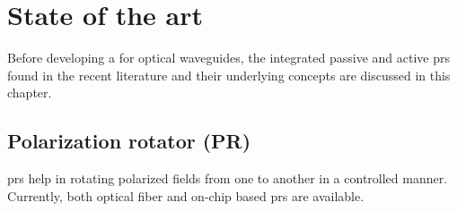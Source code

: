 \documentclass[../report.tex]{subfiles}
\begin{document}
	
	
\chapter{State of the art}
Before developing a  for optical waveguides, the integrated passive and active \gls{pr}s found in the recent literature and their underlying concepts are discussed in this chapter. 
			
	\section{Polarization rotator (PR)}	
\gls{pr}s help in rotating polarized fields from one to another in a controlled manner. Currently, both optical fiber and on-chip based \gls{pr}s are available. 	
\end{document}
